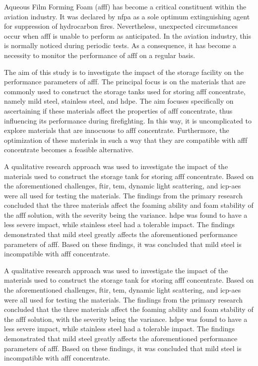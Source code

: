 Aqueous Film Forming Foam (\acrshort{afff}) has become a critical constituent within the aviation industry. It was declared by \Acrfull{nfpa} as a sole optimum extinguishing agent for suppression of hydrocarbon fires. Nevertheless, unexpected circumstances occur when \acrshort{afff} is unable to perform as anticipated. In the aviation industry, this is normally noticed during periodic tests. As a consequence, it has become a necessity to monitor the performance of \acrshort{afff} on a regular basis.

The aim of this study is to investigate the impact of the storage facility on the performance parameters of \acrshort{afff}. The principal focus is on the materials that are commonly used to construct the storage tanks used for storing \acrshort{afff} concentrate, namely mild steel, stainless steel, and \acrfull{hdpe}. The aim focuses specifically on ascertaining if these materials affect the properties of \acrshort{afff} concentrate, thus influencing its performance during firefighting. In this way, it is uncomplicated to explore materials that are innocuous to \acrshort{afff} concentrate. Furthermore, the optimization of these materials in such a way that they are compatible with \acrshort{afff} concentrate becomes a feasible alternative.

A qualitative research approach was used to investigate the impact of the materials used to construct the storage tank for storing \acrshort{afff} concentrate. Based on the aforementioned challenges, \Acrfull{ftir}, \acrfull{tem}, dynamic light scattering, and \acrfull{icp-aes} were all used for testing the materials. The findings from the primary research concluded that the three materials affect the foaming ability and foam stability of the \acrshort{afff} solution, with the severity being the variance. \acrshort{hdpe} was found to have a less severe impact, while stainless steel had a tolerable impact. The findings demonstrated that mild steel greatly affects the aforementioned performance parameters of \acrshort{afff}. Based on these findings, it was concluded that mild steel is incompatible with \acrshort{afff} concentrate.

A qualitative research approach was used to investigate the impact of the materials used to construct the storage tank for storing \acrshort{afff} concentrate. Based on the aforementioned challenges, \Acrfull{ftir}, \acrfull{tem}, dynamic light scattering, and \acrfull{icp-aes} were all used for testing the materials. The findings from the primary research concluded that the three materials affect the foaming ability and foam stability of the \acrshort{afff} solution, with the severity being the variance. \acrshort{hdpe} was found to have a less severe impact, while stainless steel had a tolerable impact. The findings demonstrated that mild steel greatly affects the aforementioned performance parameters of \acrshort{afff}. Based on these findings, it was concluded that mild steel is incompatible with \acrshort{afff} concentrate.
